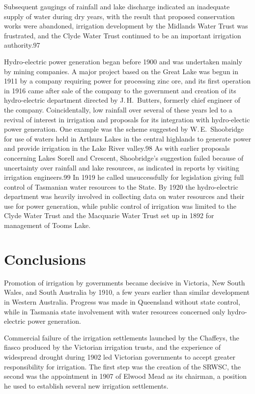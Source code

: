 Subsequent gaugings of rainfall and lake discharge indicated an
inadequate supply of water during dry years, with the result that
proposed conservation works were abandoned, irrigation development by
the Midlands Water Trust was frustrated, and the Clyde Water Trust
continued to be an important irrigation authority.97

Hydro-electric power generation began before 1900 and was undertaken
mainly by mining companies. A major project based on the Great Lake
was begun in 1911 by a company requiring power for processing zinc
ore, and its first operation in 1916 came after sale of the company to
the government and creation of its hydro-electric department directed
by J.\,H.~Butters, formerly chief engineer of the company.
Coincidentally, low rainfall over several of these years led to a
revival of interest in irrigation and proposals for its integration
with hydro-electic power generation.  One example was the scheme
suggested by W.\,E.~Shoobridge for use of waters held in Arthurs Lakes
in the central highlands to generate power and provide irrigation in
the Lake River valley.98 As with earlier proposals concerning Lakes
Sorell and Crescent, Shoobridge's suggestion failed because of
uncertainty over rainfall and lake resources, as indicated in reports
by visiting irrigation engineers.99 In 1919 he called unsuccessfully
for legislation giving full control of Tasmanian water resources to
the State.  By 1920 the hydro-electric department was heavily involved
in collecting data on water resources and their use for power
generation, while public control of irrigation was limited to the
Clyde Water Trust and the Macquarie Water Trust set up in 1892 for
management of Tooms Lake.

\section{Conclusions}

Promotion of irrigation by governments became decisive in Victoria,
New South Wales, and South Australia by 1910, a few years earlier than
similar development in Western Australia.  Progress was made in
Queensland without state control, while in Tasmania state involvement
with water resources concerned only hydro-electric power generation.

Commercial failure of the irrigation settlements launched by the
Chaffeys, the fiasco produced by the Victorian irrigation trusts, and
the experience of widespread drought during 1902 led Victorian
governments to accept greater responsibility for irrigation.  The
first step was the creation of the SRWSC, the second was the
appointment in 1907 of Elwood Mead as its chairman, a position he used
to establish several new irrigation settlements.

